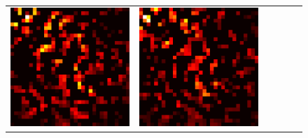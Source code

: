 \documentclass[preprint,12pt]{elsarticle}
\begin{document}
\begin{figure}[p]
\begin{tabular}{cccccc}
  \includegraphics[scale=\scale]{../visualizations/examples/cifar10/resnet18/active_saliency_map/2.png} & 
  \includegraphics[scale=\scale]{../visualizations/examples/cifar10/resnet18/inactive_saliency_map/2.png} \\
  

\end{tabular}
\end{figure}
\end{document}
